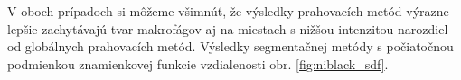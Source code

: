 \documentclass[a4paper,11pt,oneside]{article}%
\begin{document}
V oboch prípadoch si môžeme všimnúť, že výsledky prahovacích metód výrazne lepšie zachytávajú tvar makrofágov aj na miestach s nižšou intenzitou narozdiel od globálnych prahovacích metód. 
Výsledky segmentačnej metódy s počiatočnou podmienkou znamienkovej funkcie vzdialenosti obr. \ref{fig:niblack_sdf}.


\begin{figure}[H]  
    \hspace{5px}

\end{figure}
\end{document}
